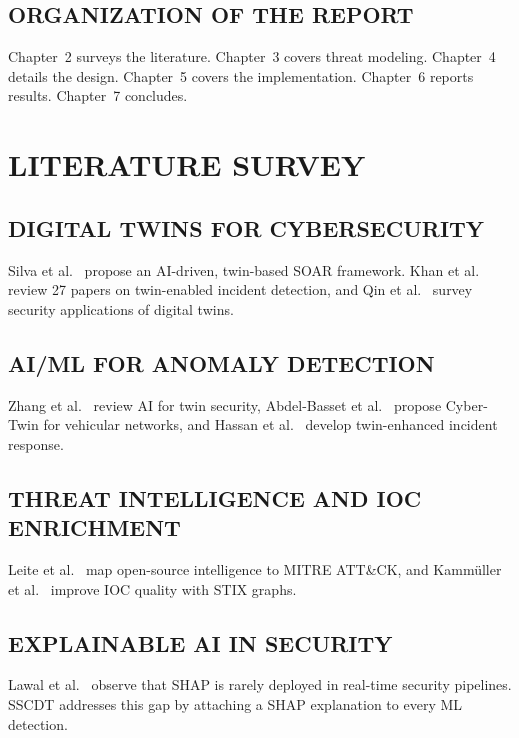 \documentclass[12pt,a4paper]{amritareport}
\begin{document}
\section{ORGANIZATION OF THE REPORT}

Chapter~2 surveys the literature. Chapter~3 covers threat modeling. Chapter~4 details the design. Chapter~5 covers the implementation. Chapter~6 reports results. Chapter~7 concludes.

\chapter{LITERATURE SURVEY}

\section{DIGITAL TWINS FOR CYBERSECURITY}

Silva et al.~\cite{ref1} propose an AI-driven, twin-based SOAR framework. Khan et al.~\cite{ref2} review 27 papers on twin-enabled incident detection, and Qin et al.~\cite{ref4} survey security applications of digital twins.

\section{AI/ML FOR ANOMALY DETECTION}

Zhang et al.~\cite{ref5} review AI for twin security, Abdel-Basset et al.~\cite{ref6} propose Cyber-Twin for vehicular networks, and Hassan et al.~\cite{ref7} develop twin-enhanced incident response.

\section{THREAT INTELLIGENCE AND IOC ENRICHMENT}

Leite et al.~\cite{ref9} map open-source intelligence to MITRE ATT\&CK, and Kamm\"uller et al.~\cite{ref19} improve IOC quality with STIX graphs.

\section{EXPLAINABLE AI IN SECURITY}

Lawal et al.~\cite{ref17} observe that SHAP is rarely deployed in real-time security pipelines. SSCDT addresses this gap by attaching a SHAP explanation to every ML detection.
\end{document}
